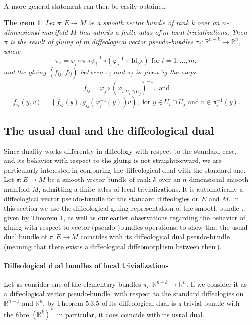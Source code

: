 \documentclass{article}
\newtheorem{thm}[lemma]{Theorem}
\newcommand\matR{{\mathbb{R}}}
\begin{document}
A more general statement can then be easily obtained.

\begin{thm}\label{smooth:bundle:equals:diffeol:bundle:thm}
Let $\pi:E\to M$ be a smooth vector bundle of rank $k$ over an $n$-dimensional manifold $M$ that admits a finite atlas of $m$ local trivializations. Then $\pi$ is the result of gluing of $m$ diffeological 
vector pseudo-bundles $\pi_i:\matR^{n+k}\to\matR^n$, where
$$\pi_i=\varphi_i\circ\pi\circ\psi_i^{-1}\circ(\varphi_i^{-1}\times\mbox{Id}_{\matR^k})\mbox{ for }i=1,\ldots,m,$$ and the gluing $(\tilde{f}_{ij},f_{ij})$ between $\pi_i$ and $\pi_j$ is given by the maps
$$f_{ij}=\varphi_j\circ(\varphi_i|_{U_i\cap U_j})^{-1},\mbox{ and}$$ 
$$\tilde{f}_{ij}(y,v)=(f_{ij}(y),g_{ij}(\varphi_i^{-1}(y))v),\mbox{ for }y\in U_i\cap U_j\mbox{ and }v\in\pi_i^{-1}(y).$$
\end{thm}


\subsection{The usual dual and the diffeological dual}

Since duality works differently in diffeology with respect to the standard case, and its behavior with respect to the gluing is not straightforward, we are particularly interested in comparing the diffeological dual 
with the standard one. Let $\pi:E\to M$ be a smooth vector bundle of rank $k$ over an $n$-dimensional smooth manifold $M$, admitting a finite atlas of local trivializations. It is automatically a diffeological 
vector pseudo-bundle for the standard diffeologies on $E$ and $M$. In this section we use the diffeological gluing representation of the smooth bundle $\pi$ given by Theorem 
\ref{smooth:bundle:equals:diffeol:bundle:thm}, as well as our earlier observations regarding the behavior of gluing with respect to vector (pseudo-)bundles operations, to show that the usual dual bundle of 
$\pi:E\to M$ coincides with its diffeological dual pseudo-bundle (meaning that there exists a diffeological diffeomorphism between them).

\paragraph{Diffeological dual bundles of local trivializations} Let us consider one of the elementary bundles $\pi_i:\matR^{n+k}\to\matR^n$. If we consider it as a diffeological vector pseudo-bundle, with 
respect to the standard diffeologies on $\matR^{n+k}$ and $\matR^n$, by Theorem 5.3.5 of \cite{vincent} its diffeological dual is a trivial bundle with the fibre $(\matR^k)^*$; in particular, it does coincide with 
its usual dual.
\end{document}
